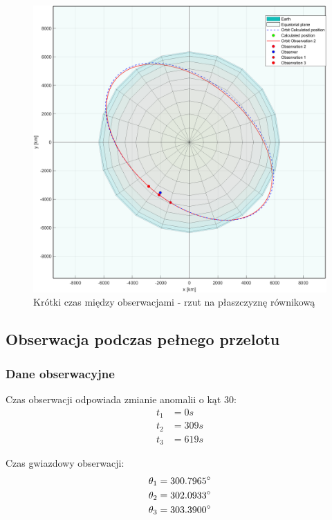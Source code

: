     \begin{figure}[h]
    \centering
    \includegraphics[width=\textwidth]{tex/img/StellariumFigure_rownikowa.png}
    \caption{Krótki czas między obserwacjami - rzut na płaszczyznę równikową}
    \label{fig:Krotki-2}
    \end{figure}


\FloatBarrier
\subsection{Obserwacja podczas pełnego przelotu}
\label{sub:Pelny}
       \subsubsection{Dane obserwacyjne}

    Czas obserwacji odpowiada zmianie anomalii o kąt 30\degree: 
        \begin{align*}
            t_{1} &= 0 s \\
            t_{2} &= 309 s  \\
            t_{3} &= 619 s
        \end{align*}    
        
    Czas gwiazdowy obserwacji: 
        \begin{align*}
            \theta_1 &= 300.7965\degree \\
            \theta_2 &= 302.0933\degree  \\
            \theta_3 &= 303.3900\degree
        \end{align*}

